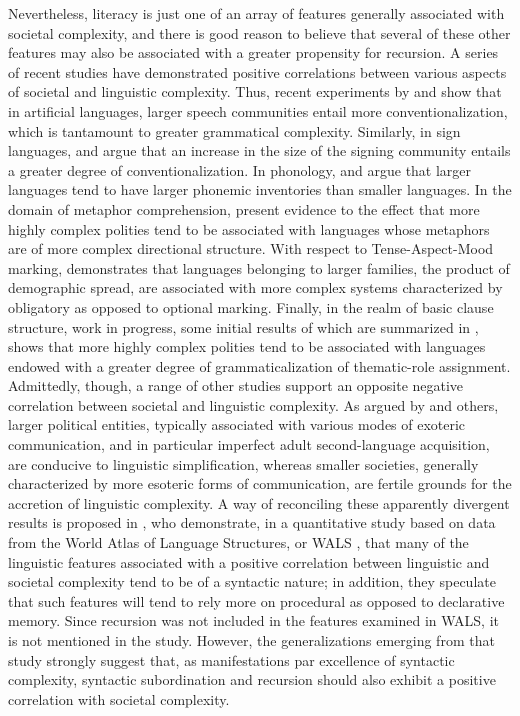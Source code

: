 \documentclass[output=paper,colorlinks,citecolor=brown
]{langscibook}
\begin{document}
Nevertheless, literacy is just one of an array of features generally associated with societal complexity, and there is good reason to believe that several of these other features may also be associated with a greater propensity for recursion.  A series of recent studies have demonstrated positive correlations between various aspects of societal and linguistic complexity.  Thus, recent experiments by \citet{raviv2019larger,raviv2020role} and \citet{raviv2020language} show that in artificial languages, larger speech communities entail more conventionalization, which is tantamount to greater grammatical complexity. Similarly, in sign languages, \citet{meir2012influence} and \citet{ergin2020community} argue that an increase in the size of the signing community entails a greater degree of conventionalization.  In phonology, \citet{hay2007phoneme,atkinson2011phonemic,wichmann2011phonological} and \citet{nettle2012social} argue that larger languages tend to have larger phonemic inventories than smaller languages. In the domain of metaphor comprehension, \citet{gil2021metaphors} present evidence to the effect that more highly complex polities tend to be associated with languages whose metaphors are of more complex directional structure.  With respect to Tense-Aspect-Mood marking, \citet{gil2021tense} demonstrates that languages belonging to larger families, the product of demographic spread, are associated with more complex systems characterized by obligatory as opposed to optional marking.  Finally, in the realm of basic clause structure, work in progress, some initial results of which are summarized in \citet{gil2019grammar}, shows that more highly complex polities tend to be associated with languages endowed with a greater degree of grammaticalization of thematic-role assignment.  Admittedly, though, a range of other studies support an opposite negative correlation between societal and linguistic complexity.  As argued by \citet{mcwhorter2018creole,mcwhorter2005defining,mcwhorter2011linguistic,dahl2004growth,wray2007consequences,lupyan2010language,trudgill2011sociolinguistic} and others, larger political entities, typically associated with various modes of exoteric communication, and in particular imperfect adult second-language acquisition, are conducive to linguistic simplification, whereas smaller societies, generally characterized by more esoteric forms of communication, are fertile grounds for the accretion of linguistic complexity.  A way of reconciling these apparently divergent results is proposed in \citet{chen2023linguistic}, who demonstrate, in a quantitative study based on data from the World Atlas of Language Structures, or WALS \citep{haspelmath2005atlas}, that many of the linguistic features associated with a positive correlation between linguistic and societal complexity tend to be of a syntactic nature; in addition, they speculate that such features will tend to rely more on procedural as opposed to declarative memory. Since recursion was not included in the features examined in WALS, it is not mentioned in the \citet{chen2023linguistic} study.  However, the generalizations emerging from that study strongly suggest that, as manifestations par excellence of syntactic complexity, syntactic subordination and recursion should also exhibit a positive correlation with societal complexity.
\end{document}
